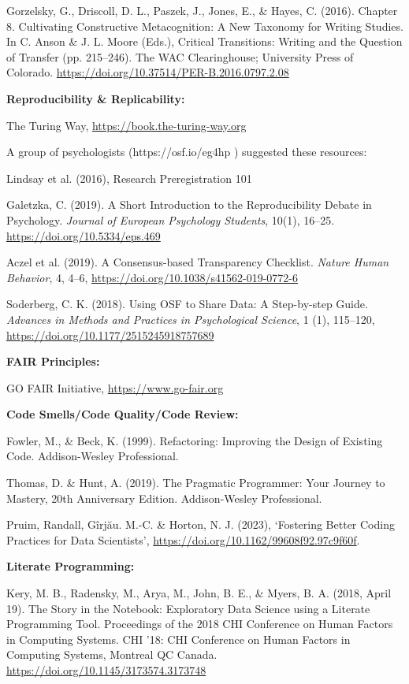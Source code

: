 \documentclass[11pt]{article}
\begin{document}
Gorzelsky, G., Driscoll, D. L., Paszek, J., Jones, E., \& Hayes, C. (2016). Chapter 8. Cultivating Constructive Metacognition: A New Taxonomy for Writing Studies. In C. Anson \& J. L. Moore (Eds.), Critical Transitions: Writing and the Question of Transfer (pp. 215–246). The WAC Clearinghouse; University Press of Colorado. \url{https://doi.org/10.37514/PER-B.2016.0797.2.08}

\vspace{.1in}
\noindent
{\bf Reproducibility \& Replicability:}

The Turing Way, \url{https://book.the-turing-way.org}

A group of psychologists (https://osf.io/eg4hp ) suggested these resources:

Lindsay et al. (2016), Research Preregistration 101

Galetzka, C. (2019). A Short Introduction to the Reproducibility Debate in Psychology. \emph{Journal of European Psychology Students}, 10(1), 16–25. \url{https://doi.org/10.5334/eps.469}

Aczel et al. (2019). A Consensus-based Transparency Checklist. \emph{Nature Human Behavior},
4, 4–6, \url{https://doi.org/10.1038/s41562-019-0772-6}

Soderberg, C. K. (2018). Using OSF to Share Data: A Step-by-step Guide.
\emph{Advances in Methods and Practices in Psychological Science}, 1 (1), 115–120, \url{https://doi.org/10.1177/2515245918757689}


\vspace{.1in}
\noindent
{\bf FAIR Principles:}

GO FAIR Initiative, \href{https://www.go-fair.org}{https://www.go-fair.org} 

\vspace{.1in}
\noindent
{\bf Code Smells/Code Quality/Code Review:}

Fowler, M., \& Beck, K. (1999). Refactoring: Improving the Design of Existing Code. Addison-Wesley Professional.

Thomas, D. \& Hunt, A. (2019). The Pragmatic Programmer: Your Journey to Mastery, 20th Anniversary Edition. Addison-Wesley Professional.

Pruim, Randall, Gîrjău. M.-C. \& Horton, N. J. (2023), ‘Fostering Better Coding Practices for Data Scientists’, \url{https://doi.org/10.1162/99608f92.97c9f60f}.

\vspace{.1in}
\noindent
{\bf Literate Programming:}

Kery, M. B., Radensky, M., Arya, M., John, B. E., \& Myers, B. A. (2018, April 19). The Story in the Notebook: Exploratory Data Science using a Literate Programming Tool. Proceedings of the 2018 CHI Conference on Human Factors in Computing Systems. CHI ’18: CHI Conference on Human Factors in Computing Systems, Montreal QC Canada. \url{https://doi.org/10.1145/3173574.3173748}
\end{document}

